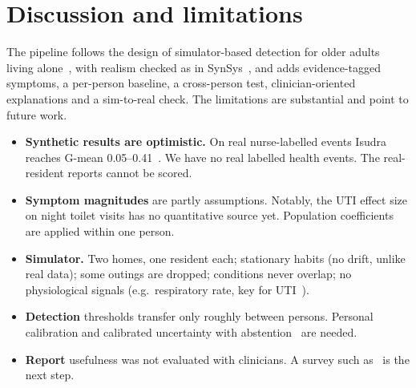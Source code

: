 \documentclass[10pt,a4paper]{article}
\begin{document}
\begin{table}[h]
\centering\small

\caption{Report-level evaluation on 32 fresh synthetic people (35-day reports). Sensitivity: a change is reported when
the condition is active for at least 3 days of the period. Correct: the report names it. Wrong claim: the report names a
condition that is not active. Real residents: share of reports naming a condition.}
\label{tab:report}
\end{table}

\section{Discussion and limitations}
The pipeline follows the design of simulator-based detection for older adults living alone~\cite{tanaka2023simulation,tanaka2024detection},
with realism checked as in SynSys~\cite{dahmen2019synsys}, and adds evidence-tagged symptoms, a per-person baseline, a
cross-person test, clinician-oriented explanations and a sim-to-real check. The limitations are substantial and point to
future work.
\begin{itemize}\itemsep0pt
\item \textbf{Synthetic results are optimistic.} On real nurse-labelled events Isudra reaches G-mean 0.05--0.41~\cite{dahmen2021isudra}.
  We have no real labelled health events. The real-resident reports cannot be scored.
\item \textbf{Symptom magnitudes} are partly assumptions. Notably, the UTI effect size on night toilet visits has no
  quantitative source yet. Population coefficients~\cite{petersen2015timeout} are applied within one person.
\item \textbf{Simulator.} Two homes, one resident each; stationary habits (no drift, unlike real data); some outings are
  dropped; conditions never overlap; no physiological signals (e.g.\ respiratory rate, key for UTI~\cite{capstick2024uti}).
\item \textbf{Detection} thresholds transfer only roughly between persons. Personal calibration and calibrated
  uncertainty with abstention~\cite{ugwu2026clinician} are needed.
\item \textbf{Report} usefulness was not evaluated with clinicians. A survey such as~\cite{ugwu2026clinician} is the next step.
\end{itemize}
\end{document}
